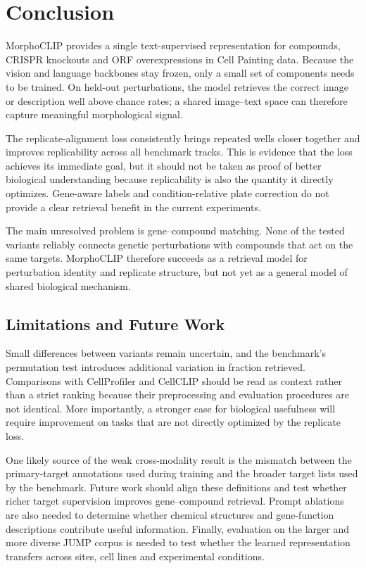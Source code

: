 \section{Conclusion}
\label{sec:conclusion}

MorphoCLIP provides a single text-supervised representation for compounds, CRISPR knockouts and ORF
overexpressions in Cell Painting data. Because the vision and language backbones stay frozen, only
a small set of components needs to be trained. On held-out perturbations, the model retrieves the
correct image or description well above chance rates; a shared image--text space can therefore
capture meaningful morphological signal.

The replicate-alignment loss consistently brings repeated wells closer together and improves
replicability across all benchmark tracks. This is evidence that the loss achieves its immediate
goal, but it should not be taken as proof of better biological understanding because replicability
is also the quantity it directly optimizes. Gene-aware labels and condition-relative plate
correction do not provide a clear retrieval benefit in the current experiments.

The main unresolved problem is gene--compound matching. None of the tested variants reliably
connects genetic perturbations with compounds that act on the same targets. MorphoCLIP therefore
succeeds as a retrieval model for perturbation identity and replicate structure, but not yet as a
general model of shared biological mechanism.

\subsection{Limitations and Future Work}

Small differences between variants remain uncertain, and the benchmark's permutation test
introduces additional variation in fraction retrieved. Comparisons with CellProfiler and CellCLIP
should be read as context rather than a strict ranking because their preprocessing and evaluation
procedures are not identical. More importantly, a stronger case for biological usefulness will
require improvement on tasks that are not directly optimized by the replicate loss.

One likely source of the weak cross-modality result is the mismatch between the primary-target
annotations used during training and the broader target lists used by the benchmark. Future work
should align these definitions and test whether richer target supervision improves gene--compound
retrieval. Prompt ablations are also needed to determine whether chemical structures and
gene-function descriptions contribute useful information. Finally, evaluation on the larger and
more diverse JUMP corpus is needed to test whether the learned representation transfers across
sites, cell lines and experimental conditions.

\codeavailability
